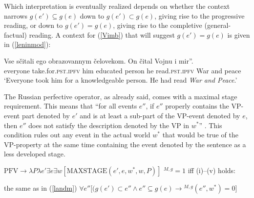\documentclass[output=paper,colorlinks,citecolor=brown]{langscibook}
\begin{document}
Which interpretation is eventually realized depends on whether the context narrows $g(e')\subseteq g(e)$ down to $g(e')\subset g(e)$, giving rise to the progressive reading, or down to $g(e') = g(e)$, giving rise to the completive (general-factual) reading. A context for (\ref{Vimb}) that will suggest $g(e') = g(e)$ is given in (\ref{leninmod}): 

\ea\label{leninmod}
\gll Vse sčitali ego obrazovannym čelovekom. On čital  Vojnu i mir''. \\
everyone take.for.\textsc{pst.ipfv} him 
educated person he read.\textsc{pst.ipfv} {} War and peace \\
\glt `Everyone took him for a knowledgeable person. He had read \textit{War and Peace}.'
\z

\noindent The Russian perfective operator, as already said, comes with a maximal stage requirement. 
This means that ``for all events $e''$, if $e''$ properly contains the VP-event part denoted by $e'$ and is at least a sub-part of the VP-event denoted by $e$, then $e''$ does not satisfy the description denoted by the VP in $w^*$'' \citep[761]{Altshuler2014}. This condition rules out any event in the actual world $w^*$ that would be true of the VP-property at the same time containing the event denoted by the sentence as a less developed stage. 

\begin{exe}
\ex\label{pfvalt} 
\begin{xlist}
\ex\label{maxstage} 
$\text{PFV} \rightarrow \lambda P \lambda e' \exists e \exists w [\text{MAXSTAGE}(e', e, w^*, w, P)]$
\ex\label{maxstage1} $^{M,g}=1$ iff (i)--(v) holds:
 \begin{xlist}
  the same as in (\ref{landm})
  $\forall e'' [(g(e') \subset e'' \wedge e'' \subseteq g(e) \rightarrow $$^{M,g} (e'',w^*)  = 0]$
 \end{xlist}
\end{xlist}
\end{exe}

\end{document}
